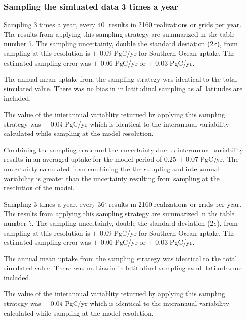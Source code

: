 \documentclass[11pt, a4paper]{article}
\numberwithin{figure}{section}
\numberwithin{table}{section}
\begin{document}
\subsubsection{Sampling the simluated data 3 times a year}

Sampling 3 times a year, every 40$^{\circ}$ results in 2160 realizations 
or grids per year. The results from applying this sampling strategy are
summarized in the table number ?.
The sampling uncertainty, double the standard deviation (2$\sigma$), 
from sampling at this resolution is
$\pm$ 0.09 PgC/yr for Southern Ocean uptake.
The estimated sampling error was 
$\pm$ 0.06 PgC/yr or $\pm$ 0.03 PgC/yr.

The annual mean uptake from the sampling strategy was identical to 
the total simulated value. There was no bias in in latitudinal sampling
as all latitudes are included.

The value of the interannual variablity returned by applying this
sampling strategy was $\pm$ 0.04 PgC/yr which is identical to the 
interannual variability calculated while sampling at the model 
resolution. 

Combining the sampling error and the uncertainty due to interannual
variability results in an averaged uptake for the model period of 
0.25 $\pm$ 0.07 PgC/yr.
The uncertainty calculated from combining the the sampling and 
interannual variability is greater than the uncertainty resulting from
sampling at the resolution of the model.


Sampling 3 times a year, every 36$^{\circ}$ results in 2160 realizations 
or grids per year. The results from applying this sampling strategy are
summarized in the table number ?.
The sampling uncertainty, double the standard deviation (2$\sigma$), 
from sampling at this resolution is
$\pm$ 0.09 PgC/yr for Southern Ocean uptake.
The estimated sampling error was 
$\pm$ 0.06 PgC/yr or $\pm$ 0.03 PgC/yr.

The annual mean uptake from the sampling strategy was identical to 
the total simulated value. There was no bias in in latitudinal sampling
as all latitudes are included.

The value of the interannual variablity returned by applying this
sampling strategy was $\pm$ 0.04 PgC/yr which is identical to the 
interannual variability calculated while sampling at the model 
resolution. 
\end{document}
